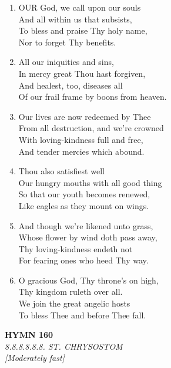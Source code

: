 \begin{enumerate}
    \item OUR God, we call upon our souls \\
        And all within us that subsists, \\
        To bless and praise Thy holy name, \\
        Nor to forget Thy benefits.

    \item All our iniquities and sins, \\
        In mercy great Thou hast forgiven, \\
        And healest, too, diseases all \\
        Of our frail frame by boons from heaven.

    \item Our lives are now redeemed by Thee \\
        From all destruction, and we're crowned \\
        With loving-kindness full and free, \\
        And tender mercies which abound.

    \item Thou also satisfiest well \\
        Our hungry mouths with all good thing \\
        So that our youth becomes renewed, \\
        Like eagles as they mount on wings.

    \item And though we're likened unto grass, \\
        Whose flower by wind doth pass away, \\
        Thy loving-kindness endeth not \\
        For fearing ones who heed Thy way.

    \item O gracious God, Thy throne's on high, \\
        Thy kingdom ruleth over all. \\
        We join the great angelic hosts \\
        To bless Thee and before Thee fall.

\end{enumerate}

\newpage
\begin{center}
    {\Large \textbf{HYMN 160}}
    \\
    \textit{8.8.8.8.8.8. ST. CHRYSOSTOM}
    \\
    \textit{\small [Moderately fast]}
\end{center}
\vspace{1em}


